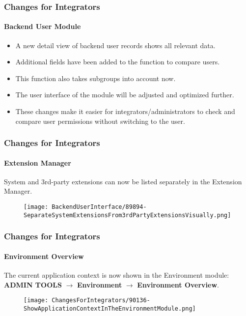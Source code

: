 
\begin{frame}[fragile]
	\frametitle{Changes for Integrators}
	\framesubtitle{Backend User Module}

	\begin{itemize}
		\item A new detail view of backend user records shows all relevant data.
		\item Additional fields have been added to the function to compare users.
		\item This function also takes subgroups into account now.
		\item The user interface of the module will be adjusted and optimized further.
		\item These changes make it easier for integrators/administrators to check
			and compare user permissions without switching to the user.
	\end{itemize}

\end{frame}


\begin{frame}[fragile]
	\frametitle{Changes for Integrators}
	\framesubtitle{Extension Manager}

	System and 3rd-party extensions can now be listed separately in the Extension Manager.

	\begin{figure}
		\texttt{[image: BackendUserInterface/89894-SeparateSystemExtensionsFrom3rdPartyExtensionsVisually.png]}
	\end{figure}

\end{frame}


\begin{frame}[fragile]
	\frametitle{Changes for Integrators}
	\framesubtitle{Environment Overview}

	The current application context is now shown in the Environment module:\newline
	\textbf{ADMIN TOOLS} $\rightarrow$ \textbf{Environment} $\rightarrow$ \textbf{Environment Overview}.

	\begin{figure}
		\texttt{[image: ChangesForIntegrators/90136-ShowApplicationContextInTheEnvironmentModule.png]}
	\end{figure}

\end{frame}

